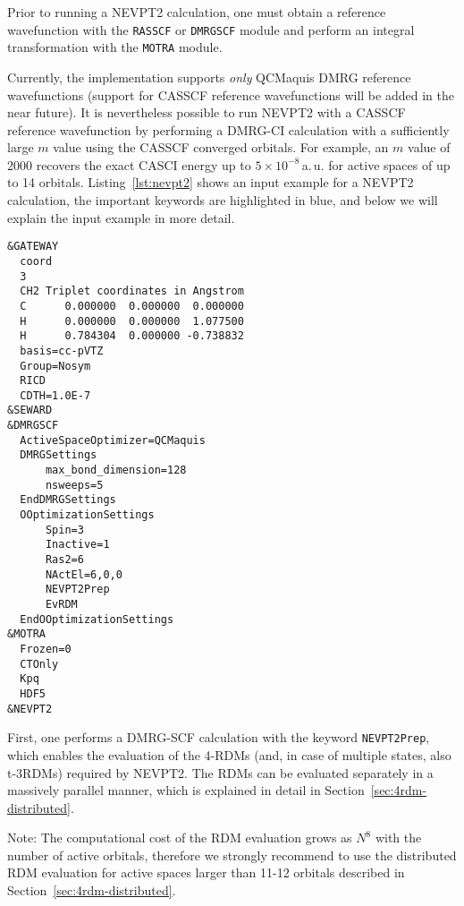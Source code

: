 \documentclass[bibliography=totoc,12pt,a4paper]{scrartcl}
\newcommand{\kwd}[1]{\texttt{#1}}
\begin{document}
Prior to running a NEVPT2 calculation, one must obtain a reference wavefunction with the \kwd{RASSCF} or \kwd{DMRGSCF} module and perform an integral transformation with the \kwd{MOTRA} module.

Currently, the implementation supports \emph{only} QCMaquis DMRG reference wavefunctions (support for CASSCF reference wavefunctions will be added in the near future). It is nevertheless possible to run NEVPT2 with a CASSCF reference wavefunction by performing a DMRG-CI calculation with a sufficiently large $m$ value using the CASSCF converged orbitals. For example, an $m$ value of 2000 recovers the exact CASCI energy up to $5\times{}10^{-8}$\,a.\,u. for active spaces of up to 14 orbitals. Listing~\ref{lst:nevpt2} shows an input example for a NEVPT2 calculation, the important keywords are highlighted in \textcolor{green!20!blue}{blue}, and below we will explain the input example in more detail.

\begin{lstlisting}[language=molcas,caption={(\texttt{009.input} in the QCMaquis test subdirectory) Input example for a one-shot NEVPT2 calculation (Singlet CH$_2$, 6 electrons in 6 orbitals, RICD)},label=lst:nevpt2]
&GATEWAY
  coord
  3
  CH2 Triplet coordinates in Angstrom
  C      0.000000  0.000000  0.000000
  H      0.000000  0.000000  1.077500
  H      0.784304  0.000000 -0.738832
  basis=cc-pVTZ
  Group=Nosym
  RICD
  CDTH=1.0E-7
&SEWARD
&DMRGSCF
  ActiveSpaceOptimizer=QCMaquis
  DMRGSettings
      max_bond_dimension=128
      nsweeps=5
  EndDMRGSettings
  OOptimizationSettings
      Spin=3
      Inactive=1
      Ras2=6
      NActEl=6,0,0
      NEVPT2Prep
      EvRDM
  EndOOptimizationSettings
&MOTRA
  Frozen=0
  CTOnly
  Kpq
  HDF5
&NEVPT2
\end{lstlisting}

First, one performs a DMRG-SCF calculation with the keyword \kwd{NEVPT2Prep}, which enables the evaluation of the 4-RDMs (and, in case of multiple states, also t-3RDMs) required by NEVPT2. The RDMs can be evaluated separately in a massively parallel manner, which is explained in detail in Section~\ref{sec:4rdm-distributed}.

\begin{framed}
 \noindent Note: The computational cost of the RDM evaluation grows as $N^8$ with the number of active orbitals, therefore we strongly recommend to use the distributed RDM evaluation for active spaces larger than 11-12 orbitals described in Section~\ref{sec:4rdm-distributed}.
\end{framed}
\end{document}
